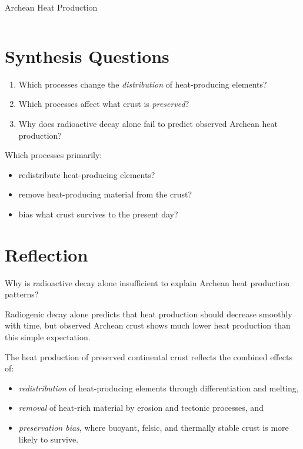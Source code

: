 \begin{activity}{Archean Heat Production}
\begin{table}[h!]
\begin{tabularx}{\textwidth}{@{}XXXX@{}}
    \bottomrule
    \end{tabularx}
\end{table}

\section*{Synthesis Questions}
\begin{enumerate}
  \item Which processes change the \emph{distribution} of heat-producing elements?
  \answerbox[2cm]
  \item Which processes affect what crust is \emph{preserved}?
  \answerbox[2cm]
  \item Why does radioactive decay alone fail to predict observed Archean heat production?
  \answerbox[3cm]
\end{enumerate}

Which processes primarily:
\begin{itemize}
  \item redistribute heat-producing elements?
  \answerbox[2cm]
  \item remove heat-producing material from the crust?
  \answerbox[2cm]
  \item bias what crust survives to the present day?
  \answerbox[2cm]
\end{itemize}

\section*{Reflection}
Why is radioactive decay alone insufficient to explain Archean heat production patterns?

\answerbox[3cm]


{
Radiogenic decay alone predicts that heat production should decrease smoothly with time, but observed Archean crust shows much lower heat production than this simple expectation.

The heat production of preserved continental crust reflects the combined effects
of:
\begin{itemize}
  \item \emph{redistribution} of heat-producing elements through differentiation and melting,
  \item \emph{removal} of heat-rich material by erosion and tectonic processes, and
  \item \emph{preservation bias}, where buoyant, felsic, and thermally stable crust is more likely to survive.
\end{itemize}

}
\end{activity}
